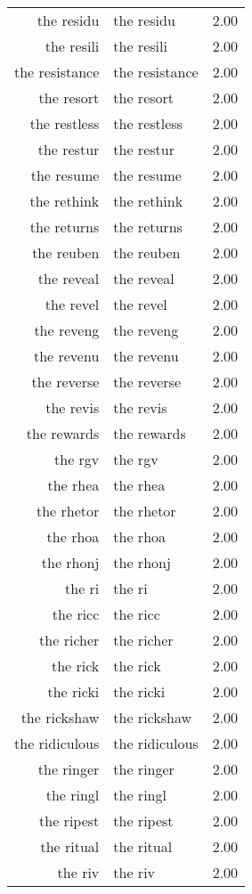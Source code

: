 \begin{table}[ht]
\begin{tabular}{rlr}
  the residu & the residu & 2.00 \\ 
  the resili & the resili & 2.00 \\ 
  the resistance & the resistance & 2.00 \\ 
  the resort & the resort & 2.00 \\ 
  the restless & the restless & 2.00 \\ 
  the restur & the restur & 2.00 \\ 
  the resume & the resume & 2.00 \\ 
  the rethink & the rethink & 2.00 \\ 
  the returns & the returns & 2.00 \\ 
  the reuben & the reuben & 2.00 \\ 
  the reveal & the reveal & 2.00 \\ 
  the revel & the revel & 2.00 \\ 
  the reveng & the reveng & 2.00 \\ 
  the revenu & the revenu & 2.00 \\ 
  the reverse & the reverse & 2.00 \\ 
  the revis & the revis & 2.00 \\ 
  the rewards & the rewards & 2.00 \\ 
  the rgv & the rgv & 2.00 \\ 
  the rhea & the rhea & 2.00 \\ 
  the rhetor & the rhetor & 2.00 \\ 
  the rhoa & the rhoa & 2.00 \\ 
  the rhonj & the rhonj & 2.00 \\ 
  the ri & the ri & 2.00 \\ 
  the ricc & the ricc & 2.00 \\ 
  the richer & the richer & 2.00 \\ 
  the rick & the rick & 2.00 \\ 
  the ricki & the ricki & 2.00 \\ 
  the rickshaw & the rickshaw & 2.00 \\ 
  the ridiculous & the ridiculous & 2.00 \\ 
  the ringer & the ringer & 2.00 \\ 
  the ringl & the ringl & 2.00 \\ 
  the ripest & the ripest & 2.00 \\ 
  the ritual & the ritual & 2.00 \\ 
  the riv & the riv & 2.00 \\ 

\end{tabular}
\end{table}
